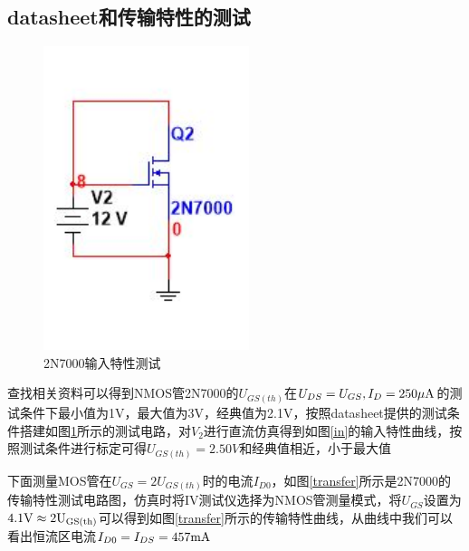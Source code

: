 \documentclass[UTF8,a4paper]{ctexart}
\begin{document}
\subsection{datasheet和传输特性的测试}
\begin{figure}
\includegraphics[width=60mm]{2-1.jpg}
\caption{2N7000输入特性测试}
\label{2in}
\end{figure}
查找相关资料可以得到NMOS管2N7000的$U_{GS(th)}$在$U_{DS}=U_{GS},I_D=250\mu\rm{A}$的测试条件下最小值为1V，最大值为3V，经典值为2.1V，按照datasheet提供的测试条件搭建如图\ref{2in}所示的测试电路，对$V_2$进行直流仿真得到如图\ref{in}的输入特性曲线，按照测试条件进行标定可得$U_{GS(th)}=2.50V$和经典值相近，小于最大值

下面测量MOS管在$U_{GS}=2U_{GS(th)}$时的电流$I_{D0}$，如图\ref{transfer}所示是2N7000的传输特性测试电路图，仿真时将IV测试仪选择为NMOS管测量模式，将$U_{GS}$设置为$4.1\rm{V}\approx2U_{GS(th)}$可以得到如图\ref{transfer}所示的传输特性曲线，从曲线中我们可以看出恒流区电流$I_{D0}=I_{DS}=457\rm{mA}$
\end{document}
